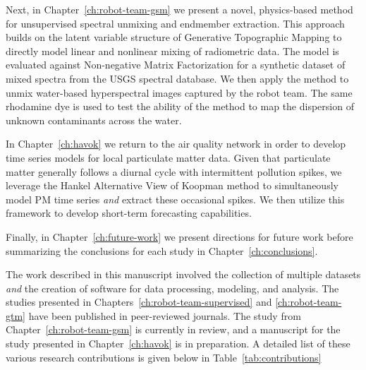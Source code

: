 Next, in Chapter~\ref{ch:robot-team-gsm} we present a novel, physics-based
method for unsupervised spectral unmixing and endmember extraction.
This approach builds on the latent variable structure of Generative Topographic
Mapping to directly model linear and nonlinear mixing of radiometric data.
The model is evaluated against Non-negative Matrix Factorization for a
synthetic dataset of mixed spectra from the USGS spectral database. We then
apply the method to unmix water-based hyperspectral images captured by the robot
team. The same rhodamine dye is used to test the ability of the method to map
the dispersion of unknown contaminants across the water.

In Chapter~\ref{ch:havok} we return to the air quality network in order to develop time
series models for local particulate matter data. Given that particulate matter
generally follows a diurnal cycle with intermittent pollution spikes, we
leverage the Hankel Alternative View of Koopman method to simultaneously model
PM time series \textit{and} extract these occasional spikes. We then utilize
this framework to develop short-term forecasting capabilities.

Finally, in Chapter~\ref{ch:future-work} we present directions for future work
before summarizing the conclusions for each study in
Chapter~\ref{ch:conclusions}.


The work described in this manuscript involved the collection of multiple
datasets \textit{and} the creation of software for data processing, modeling,
and analysis. The studies presented in Chapters~\ref{ch:robot-team-supervised}
and \ref{ch:robot-team-gtm} have been published in peer-reviewed journals. The
study from Chapter~\ref{ch:robot-team-gsm} is currently in review, and a
manuscript for the study presented in Chapter~\ref{ch:havok} is in preparation.
A detailed list of these various research contributions is given below in
Table~\ref{tab:contributions}


